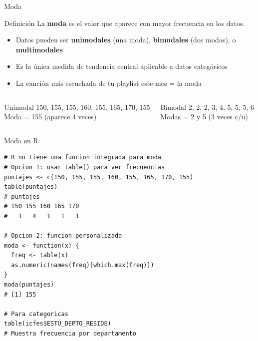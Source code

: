 \documentclass[aspectratio=169, 11pt]{beamer}
\begin{document}
\begin{frame}{Moda}
\begin{block}{Definición}
La \textbf{moda} es el valor que aparece con mayor frecuencia en los datos.
\end{block}

\begin{itemize}
\item Datos pueden ser \textbf{unimodales} (una moda), \textbf{bimodales} (dos modas), o \textbf{multimodales}
\item Es la \'unica medida de tendencia central aplicable a datos categ\'oricos
\item La canci\'on m\'as escuchada de tu playlist este mes = la moda
\end{itemize}

\begin{columns}[T]
\begin{exampleblock}{Unimodal}
150, 155, 155, 160, 155, 165, 170, 155\\
Moda = 155 (aparece 4 veces)
\end{exampleblock}

\begin{exampleblock}{Bimodal}
2, 2, 2, 3, 4, 5, 5, 5, 6\\
Modas = 2 y 5 (3 veces c/u)
\end{exampleblock}
\end{columns}
\end{frame}

\begin{frame}[fragile]{Moda en R}
\begin{lstlisting}[basicstyle=\ttfamily\scriptsize]
# R no tiene una funcion integrada para moda
# Opcion 1: usar table() para ver frecuencias
puntajes <- c(150, 155, 155, 160, 155, 165, 170, 155)
table(puntajes)
# puntajes
# 150 155 160 165 170
#   1   4   1   1   1

# Opcion 2: funcion personalizada
moda <- function(x) {
  freq <- table(x)
  as.numeric(names(freq)[which.max(freq)])
}
moda(puntajes)
# [1] 155

# Para categoricas
table(icfes$ESTU_DEPTO_RESIDE)
# Muestra frecuencia por departamento
\end{lstlisting}
\end{frame}
\end{document}
